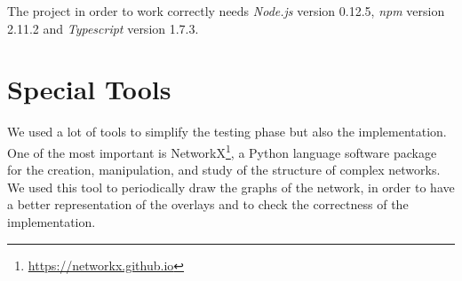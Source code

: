 The project in order to work correctly needs \textit{Node.js} version 0.12.5, \textit{npm} version 2.11.2 and \textit{Typescript} version 1.7.3.

\section{Special Tools}
We used a lot of tools to simplify the testing phase but also the implementation. One of the most important is NetworkX\footnote{\url{https://networkx.github.io}}, a Python language software package for the creation, manipulation, and study of the structure of complex networks. We used this tool to periodically draw the graphs of the network, in order to have a better representation of the overlays and to check the correctness of the implementation. 